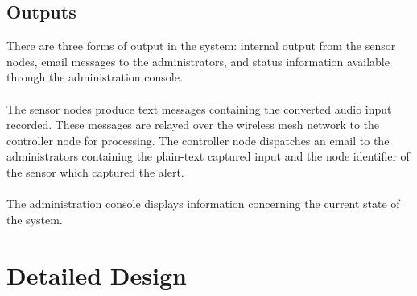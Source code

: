 \documentclass[11pt,a4paper]{article}
\begin{document}
\subsection{Outputs}
There are three forms of output in the system: internal output from the sensor nodes, email messages to the administrators, and status information available through the administration console. \\\\
The sensor nodes produce text messages containing the converted audio input recorded.  These messages are relayed over the wireless mesh network to the controller node for processing.  The controller node dispatches an email to the administrators containing the plain-text captured input and the node identifier of the sensor which captured the alert. \\\\
The administration console displays information concerning the current state of the system.

\section{Detailed Design}
\end{document}
